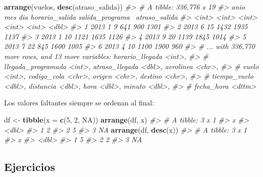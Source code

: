 \documentclass[11pt,oneside]{report}
\newenvironment{Shaded}{\begin{snugshade}}{\end{snugshade}}
\newcommand{\CommentTok}[1]{\textcolor[rgb]{0.56,0.35,0.01}{\textit{#1}}}
\newcommand{\DataTypeTok}[1]{\textcolor[rgb]{0.13,0.29,0.53}{#1}}
\newcommand{\DecValTok}[1]{\textcolor[rgb]{0.00,0.00,0.81}{#1}}
\newcommand{\KeywordTok}[1]{\textcolor[rgb]{0.13,0.29,0.53}{\textbf{#1}}}
\newcommand{\NormalTok}[1]{#1}
\newcommand{\OtherTok}[1]{\textcolor[rgb]{0.56,0.35,0.01}{#1}}
\newcommand{\StringTok}[1]{\textcolor[rgb]{0.31,0.60,0.02}{#1}}
\begin{document}
\begin{Shaded}
\begin{Highlighting}[]
\KeywordTok{arrange}\NormalTok{(vuelos, }\KeywordTok{desc}\NormalTok{(atraso_salida))}
\CommentTok{#> # A tibble: 336,776 x 19}
\CommentTok{#>    anio   mes   dia horario_salida salida_programa~ atraso_salida}
\CommentTok{#>   <int> <int> <int>          <int>            <int>         <dbl>}
\CommentTok{#> 1  2013     1     9            641              900          1301}
\CommentTok{#> 2  2013     6    15           1432             1935          1137}
\CommentTok{#> 3  2013     1    10           1121             1635          1126}
\CommentTok{#> 4  2013     9    20           1139             1845          1014}
\CommentTok{#> 5  2013     7    22            845             1600          1005}
\CommentTok{#> 6  2013     4    10           1100             1900           960}
\CommentTok{#> # ... with 336,770 more rows, and 13 more variables: horario_llegada <int>,}
\CommentTok{#> #   llegada_programada <int>, atraso_llegada <dbl>, aerolinea <chr>,}
\CommentTok{#> #   vuelo <int>, codigo_cola <chr>, origen <chr>, destino <chr>,}
\CommentTok{#> #   tiempo_vuelo <dbl>, distancia <dbl>, hora <dbl>, minuto <dbl>,}
\CommentTok{#> #   fecha_hora <dttm>}
\end{Highlighting}
\end{Shaded}

Los valores faltantes siempre se ordenan al final:

\begin{Shaded}
\begin{Highlighting}[]
\NormalTok{df <-}\StringTok{ }\KeywordTok{tibble}\NormalTok{(}\DataTypeTok{x =} \KeywordTok{c}\NormalTok{(}\DecValTok{5}\NormalTok{, }\DecValTok{2}\NormalTok{, }\OtherTok{NA}\NormalTok{))}
\KeywordTok{arrange}\NormalTok{(df, x)}
\CommentTok{#> # A tibble: 3 x 1}
\CommentTok{#>       x}
\CommentTok{#>   <dbl>}
\CommentTok{#> 1     2}
\CommentTok{#> 2     5}
\CommentTok{#> 3    NA}
\KeywordTok{arrange}\NormalTok{(df, }\KeywordTok{desc}\NormalTok{(x))}
\CommentTok{#> # A tibble: 3 x 1}
\CommentTok{#>       x}
\CommentTok{#>   <dbl>}
\CommentTok{#> 1     5}
\CommentTok{#> 2     2}
\CommentTok{#> 3    NA}
\end{Highlighting}
\end{Shaded}

\hypertarget{ejercicios-9}{%
\subsection{Ejercicios}\label{ejercicios-9}}
\end{document}
